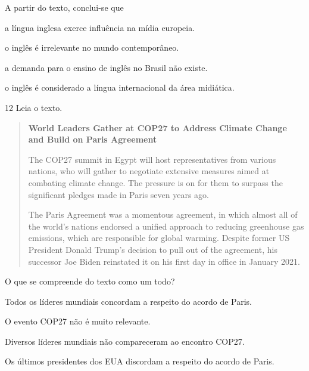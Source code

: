 A partir do texto, conclui-se que

\begin{escolha}
\item a língua inglesa exerce influência na mídia europeia.

\item o inglês é irrelevante no mundo contemporâneo.

\item a demanda para o ensino de inglês no Brasil não existe.

\item o inglês é considerado a língua internacional da área midiática.
\end{escolha}

\num{12} Leia o texto.

\begin{quote}
\textbf{World Leaders Gather at COP27 to Address Climate Change and Build on Paris Agreement}

The COP27 summit in Egypt will host representatives from various
nations, who will gather to negotiate extensive measures aimed at
combating climate change. The pressure is on for them to surpass the
significant pledges made in Paris seven years ago.

The Paris Agreement was a momentous agreement, in which almost all of
the world's nations endorsed a unified approach to reducing greenhouse
gas emissions, which are responsible for global warming. Despite former
US President Donald Trump's decision to pull out of the agreement, his
successor Joe Biden reinstated it on his first day in office in January
2021.

\end{quote}

O que se compreende do texto como um todo?

\begin{escolha}
\item Todos os líderes mundiais concordam a respeito do acordo de Paris.

\item O evento COP27 não é muito relevante.

\item Diversos líderes mundiais não compareceram ao encontro COP27.

\item Os últimos presidentes dos EUA discordam a respeito do acordo de Paris.
\end{escolha}

